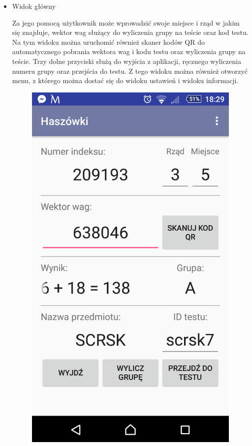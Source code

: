 \documentclass{report}
\begin{document}
		\begin{itemize}
			\item Widok główny\\
			\begin{minipage}{0.45\textwidth}
				Za jego pomocą użytkownik może wprowadzić swoje miejsce i rząd w jakim się znajduje, wektor wag służący do wyliczenia grupy na teście oraz kod testu. Na tym widoku można uruchomić również skaner kodów QR do automatycznego pobrania wektora wag i kodu testu oraz wyliczenia grupy na teście. Trzy dolne przyciski służą do wyjścia z aplikacji, ręcznego wyliczenia numeru grupy oraz przejścia do testu. Z tego widoku można również otworzyć menu, z którego można dostać się do widoku ustawień i widoku informacji.
			\end{minipage}
			\begin{minipage}{0.5\textwidth}
				\begin{figure}[H]
					\begin{center}
					\includegraphics[scale=0.1]{widok_glowny}
					\end{center}
				\end{figure}
			\end{minipage} \hfill
			

\end{itemize}
\end{document}
